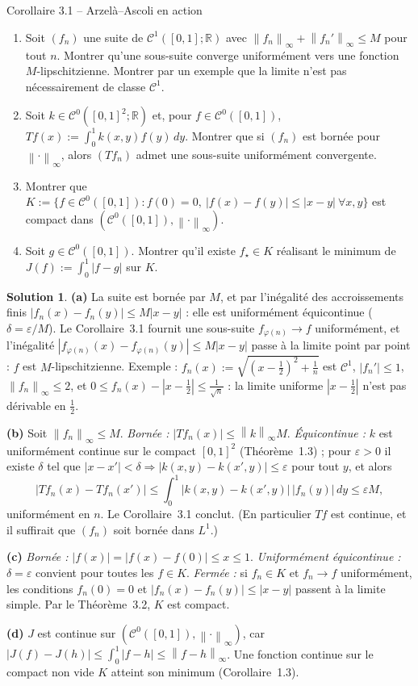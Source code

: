 \documentclass[11pt,a4paper]{article}
\newcommand{\R}{\mathbb{R}}
\newcommand{\norm}[1]{\left\|#1\right\|}
\newcommand{\Cz}{\mathcal{C}^0}
\theoremstyle{definition}
\newtheorem*{solution}{Solution}
\begin{document}
\begin{exo}{Corollaire 3.1 -- Arzelà--Ascoli en action}
\begin{enumerate}[label=(\alph*)]
  \item Soit $(f_n)$ une suite de $\mathcal C^1([0,1];\R)$ avec $\norm{f_n}_\infty+\norm{f_n'}_\infty\le M$ pour tout $n$. Montrer qu'une sous-suite converge uniformément vers une fonction $M$-lipschitzienne. Montrer par un exemple que la limite n'est pas nécessairement de classe $\mathcal C^1$.
  \item Soit $k\in\Cz([0,1]^2;\R)$ et, pour $f\in\Cz([0,1])$, $Tf(x):=\int_0^1k(x,y)f(y)\,dy$. Montrer que si $(f_n)$ est bornée pour $\norm\cdot_\infty$, alors $(Tf_n)$ admet une sous-suite uniformément convergente.
  \item Montrer que $K:=\{f\in\Cz([0,1]):f(0)=0,\ |f(x)-f(y)|\le|x-y|\ \forall x,y\}$ est compact dans $(\Cz([0,1]),\norm\cdot_\infty)$.
  \item Soit $g\in\Cz([0,1])$. Montrer qu'il existe $f_\star\in K$ réalisant le minimum de $J(f):=\int_0^1|f-g|$ sur $K$.
\end{enumerate}
\end{exo}

\begin{solution}
\noindent\textbf{(a)} La suite est bornée par $M$, et par l'inégalité des accroissements finis $|f_n(x)-f_n(y)|\le M|x-y|$ : elle est uniformément équicontinue ($\delta=\varepsilon/M$). Le Corollaire~3.1 fournit une sous-suite $f_{\varphi(n)}\to f$ uniformément, et l'inégalité $|f_{\varphi(n)}(x)-f_{\varphi(n)}(y)|\le M|x-y|$ passe à la limite point par point : $f$ est $M$-lipschitzienne. Exemple : $f_n(x):=\sqrt{(x-\frac12)^2+\frac1n}$ est $\mathcal C^1$, $|f_n'|\le1$, $\norm{f_n}_\infty\le2$, et $0\le f_n(x)-|x-\frac12|\le\frac1{\sqrt n}$ : la limite uniforme $|x-\frac12|$ n'est pas dérivable en $\frac12$.

\medskip
\noindent\textbf{(b)} Soit $\norm{f_n}_\infty\le M$. \emph{Bornée :} $|Tf_n(x)|\le\norm k_\infty M$. \emph{Équicontinue :} $k$ est uniformément continue sur le compact $[0,1]^2$ (Théorème~1.3) ; pour $\varepsilon>0$ il existe $\delta$ tel que $|x-x'|<\delta\Rightarrow|k(x,y)-k(x',y)|\le\varepsilon$ pour tout $y$, et alors
\[
|Tf_n(x)-Tf_n(x')|\le\int_0^1|k(x,y)-k(x',y)|\,|f_n(y)|\,dy\le\varepsilon M ,
\]
uniformément en $n$. Le Corollaire~3.1 conclut. (En particulier $Tf$ est continue, et il suffirait que $(f_n)$ soit bornée dans $L^1$.)

\medskip
\noindent\textbf{(c)} \emph{Bornée :} $|f(x)|=|f(x)-f(0)|\le x\le1$. \emph{Uniformément équicontinue :} $\delta=\varepsilon$ convient pour toutes les $f\in K$. \emph{Fermée :} si $f_n\in K$ et $f_n\to f$ uniformément, les conditions $f_n(0)=0$ et $|f_n(x)-f_n(y)|\le|x-y|$ passent à la limite simple. Par le Théorème~3.2, $K$ est compact.

\medskip
\noindent\textbf{(d)} $J$ est continue sur $(\Cz([0,1]),\norm\cdot_\infty)$, car $|J(f)-J(h)|\le\int_0^1|f-h|\le\norm{f-h}_\infty$. Une fonction continue sur le compact non vide $K$ atteint son minimum (Corollaire~1.3).
\end{solution}
\end{document}
